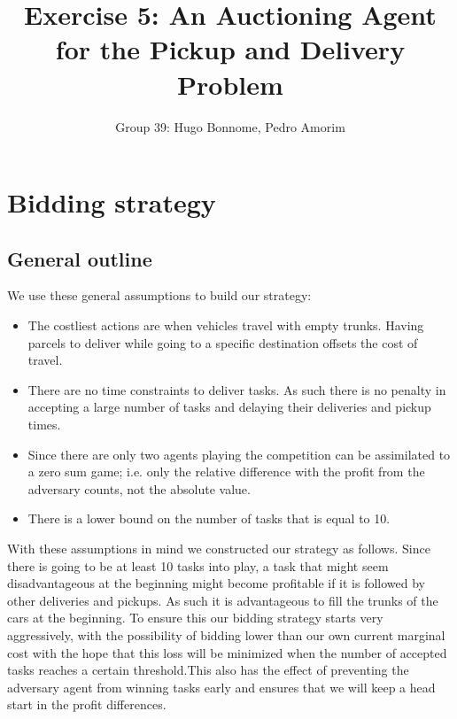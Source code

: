 \documentclass[11pt]{article}
\title{\bf Exercise 5: An Auctioning Agent for the Pickup and Delivery Problem}
\author{Group 39: Hugo Bonnome, Pedro Amorim}
\begin{document}
\maketitle

\section{Bidding strategy}
\subsection{General outline}



We use these general assumptions to build our strategy:
\begin{itemize}
\item The costliest actions are when vehicles travel with empty trunks. Having
  parcels to deliver while going to a specific destination offsets the cost of
  travel.
\item There are no time constraints to deliver tasks. As such there is no
  penalty in accepting a large number of tasks and delaying their deliveries and
  pickup times.
\item Since there are only two agents playing the competition can be assimilated
  to a zero sum game; i.e. only the relative difference with the profit from the
  adversary counts, not the absolute value.
\item There is a lower bound on the number of tasks that is equal to 10.
\end{itemize}

With these assumptions in mind we constructed our strategy as follows. Since
there is going to be at least 10 tasks into play, a task that might seem
disadvantageous at the beginning might become profitable if it is followed by
other deliveries and pickups. As such it is advantageous to fill the trunks of
the cars at the beginning. To ensure this our bidding strategy starts very
aggressively, with the possibility of bidding lower than our own current
marginal cost with the hope that this loss will be minimized when the number of
accepted tasks reaches a certain threshold.This also has the effect of
preventing the adversary agent from winning tasks early and ensures that we will
keep a head start in the profit differences.
\end{document}

